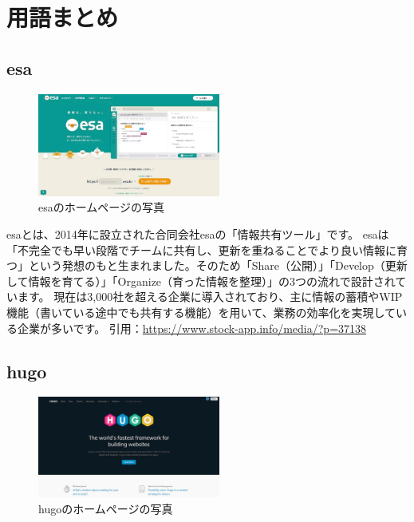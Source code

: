 \chapter{用語まとめ}

\section{esa}

  \begin{figure}[H]
    \centering
    \includegraphics[width=6cm]{./image/02-chap3/esa.png}
    \caption{esaのホームページの写真}
    \label{chap3-esa-image}
  \end{figure}


  \begin{tcolorbox}[title=esaとは]
    esaとは、2014年に設立された合同会社esaの「情報共有ツール」です。
    esaは「不完全でも早い段階でチームに共有し、更新を重ねることでより良い情報に育つ」という発想のもと生まれました。そのため「Share（公開）」「Develop（更新して情報を育てる）」「Organize（育った情報を整理）」の3つの流れで設計されています。
    現在は3,000社を超える企業に導入されており、主に情報の蓄積やWIP機能（書いている途中でも共有する機能）を用いて、業務の効率化を実現している企業が多いです。
    引用：\url{https://www.stock-app.info/media/?p=37138}

  \end{tcolorbox}

\section{hugo}

  \begin{figure}[H]
    \centering
    \includegraphics[width=6cm]{./image/02-chap3/hugo.png}
    \caption{hugoのホームページの写真}
    \label{chap3-hugo-image}
  \end{figure}


